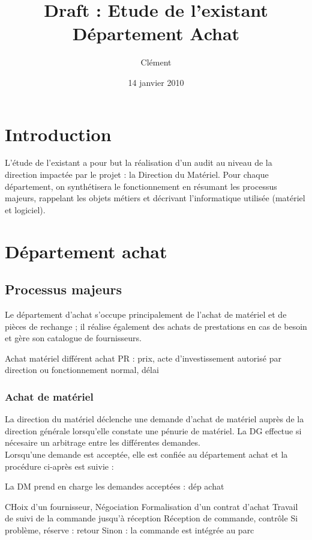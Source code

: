 \documentclass[a4paper]{article}
\title{Draft : Etude de l'existant\\Département Achat}
\author{Clément}
\date{14 janvier 2010}
\begin{document}
\maketitle

\section{Introduction}

L'étude de l'existant a pour but la réalisation d'un audit au niveau de la
direction impactée par le projet : la Direction du Matériel. Pour chaque
département, on synthétisera le fonctionnement en résumant les processus
majeurs, rappelant les objets métiers et décrivant l'informatique utilisée
(matériel et logiciel).


\section{Département achat}


\subsection{Processus majeurs}

Le département d'achat s'occupe principalement de l'achat de matériel et de
pièces de rechange ; il réalise également des achats de prestations en cas
de besoin et gère son catalogue de fournisseurs.

Achat matériel différent achat PR : prix, acte d'investissement autorisé
par direction ou fonctionnement normal, délai


\subsubsection{Achat de matériel}

La direction du matériel déclenche une demande d'achat de matériel auprès
de la direction générale lorsqu'elle constate une pénurie de matériel. La
DG effectue si nécesaire un arbitrage entre les différentes demandes.\\
Lorsqu'une demande est acceptée, elle est confiée au département achat et
la procédure ci-après est suivie :

\begin{enumerate}
\end{enumerate}

La DM prend en charge les demandes acceptées : dép achat

CHoix d'un fournisseur,
Négociation
Formalisation d'un contrat d'achat
Travail de suivi de la commande jusqu'à réception
Réception de commande, contrôle
Si problème, réserve : retour
Sinon : la commande est intégrée au parc
\end{document}
